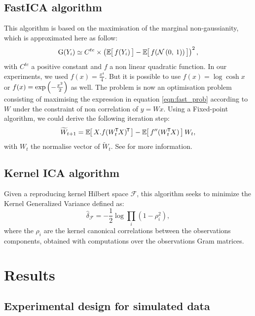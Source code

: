 \documentclass[a4paper]{article}
\newcommand{\zZ}[2]{\mathrm #1\!\zp{#2}}
\newcommand{\Ng}[2]{\mathcal{N}\zp{#1,\:#2}}
\begin{document}
\subsection{FastICA algorithm}
This algorithm is based on the maximisation of the marginal non-gaussianity, which is approximated here as follow:
\begin{equation}\label{eqn:fast_prob}
  \zZ G{Y_i} \simeq C^{te}\times\zp{\zesp{f(Y_i)} - \zesp{f(\Ng 01)}}^2,
\end{equation}
with $C^{te}$ a positive constant and $f$ a non linear quadratic function.
In our experiments, we used $f(x) = \frac{x^4}4$. But it is possible to use $f(x) = \log \cosh x$ or $f(x) = \exp\zp{-\frac{x^2}2}$ as well.
The problem is now an optimisation problem consisting of maximising the expression in equation \ref{eqn:fast_prob} according to $W$ under the constraint of non correlation of $y = Wx$. Using a Fixed-point algorithm, we could derive the following iteration step:
\begin{equation}
  \widetilde W_{t+1} = \zesp{X.\ztr{f(\ztr{W_t}X)}} - \zesp{f''(\ztr{W_t}X)}W_t,
\end{equation}
with $W_t$ the normalise vector of $\widetilde W_t$. See \cite{hyvarinen99} for more information.

\subsection{Kernel ICA algorithm}
Given a reproducing kernel Hilbert space $\mathcal{F}$, this algorithm seeks to minimize the Kernel Generalized Variance defined as:
\begin{equation}
	\widehat{\delta}_{\mathcal{F}}=-\frac{1}{2}\log \underset{i}{\prod}(1-\rho_i^2),
\end{equation}
where the $\rho_i$ are the kernel canonical correlations between the observations components, obtained with computations over the observations Gram matrices.


\section{Results}

\subsection{Experimental design for simulated data}
\end{document}
